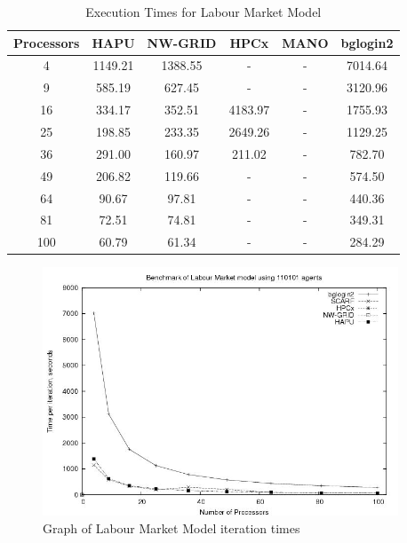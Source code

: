 {
\renewcommand{\arraystretch}{1.25}
\begin{table}[ht]
 \centering
  \begin{tabular}{c|ccccc}
 Processors &HAPU  &NW-GRID &HPCx  &MANO   &bglogin2 \\ \hline
4 &1149.21 &1388.55 &- &- &7014.64      \\
9 &585.19 &627.45 &- &- &3120.96        \\
16 &334.17 &352.51 &4183.97 &- &1755.93 \\
25 &198.85 &233.35 &2649.26 &- &1129.25 \\
36 &291.00 &160.97 &211.02 &- &782.70   \\
49 &206.82 &119.66 &- &- &574.50        \\
64 &90.67 &97.81 &- &- &440.36  \\
81 &72.51 &74.81 &- &- &349.31  \\
100 &60.79 &61.34 &- &- &284.29 \\

 \end{tabular}
 \caption{Execution Times for Labour Market Model}
 \label{tab:ExecutionTimesForLabour}
\end{table}
}
\bigskip
\begin{figure}[ht]
 \centering
  \includegraphics[width=300pt]{Labour2-graph.jpg}
 \caption{Graph of Labour Market Model iteration times}
 \label{fig:Labour-graph1}
\end{figure}

